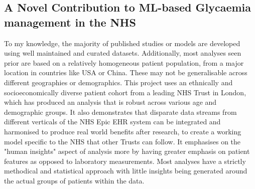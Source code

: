 
\subsection{A Novel Contribution to ML-based Glycaemia management in the NHS}

\vspace{5pt}
\noindent To my knowledge, the majority of published studies or models are developed using well maintained and curated datasets. Additionally, most analyses seen prior are based on a relatively homogeneous patient population, from a major location in countries like USA or China. These may not be generalisable across different geographies or demographics. This project uses an ethnically and socioeconomically diverse patient cohort from a leading NHS Trust in London, which has produced an analysis that is robust across various age and demographic groups. It also demonstrates that disparate data streams from different verticals of the NHS Epic EHR system can be integrated and harmonised to produce real world benefits after research, to create a working model specific to the NHS that other Trusts can follow. It emphasises on the "human insights" aspect of analysis more by having greater emphasis on patient features as opposed to laboratory measurements. Most analyses have a strictly methodical and statistical approach with little insights being generated around the actual groups of patients within the data. 
 